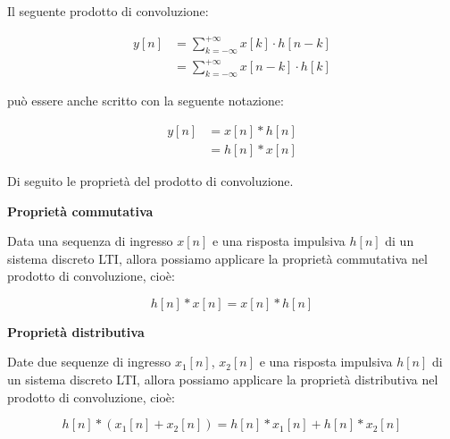 Il seguente prodotto di convoluzione: 

{
    \Large 
    \begin{equation}
        \begin{split}
        y \left[ n\right]
        &= 
        \sum_{k = - \infty}^{+ \infty}
        x \left[ k\right]
        \cdot 
        h \left[ n - k \right]
        \\
        &= 
        \sum_{k = - \infty}^{+ \infty}
        x \left[ n - k\right]
        \cdot 
        h \left[ k \right]
        \end{split}
    \end{equation}
}

può essere anche scritto con la seguente notazione: 

{
    \Large 
    \begin{equation}
        \begin{split}
        y \left[ n\right]
        &= 
        x \left[ n\right]
        *
        h \left[ n\right]
        \\
        &= 
        h \left[ n\right]
        *
        x \left[ n\right]
        \end{split}
    \end{equation}
}

Di seguito le proprietà del prodotto di convoluzione. \newline 

\textbf{Proprietà commutativa} \newline 

Data una sequenza di ingresso $x \left[ n\right]$ e una risposta impulsiva $h \left[ n\right]$ di un sistema discreto LTI, 
allora possiamo applicare la proprietà commutativa nel prodotto di convoluzione, cioè: 

{
    \Large 
    \begin{equation}
        h \left[ n\right]
        *
        x \left[ n\right]
        =
        x \left[ n\right]
        *
        h \left[ n\right] 
    \end{equation}
}

\textbf{Proprietà distributiva} \newline 

Date due sequenze di ingresso $x_1 \left[ n\right]$, $x_2 \left[ n\right]$ e una risposta impulsiva $h \left[ n\right]$ di un sistema discreto LTI, 
allora possiamo applicare la proprietà distributiva nel prodotto di convoluzione, cioè: 

{
    \Large 
    \begin{equation}
        h \left[ n\right]
        *
        \left( 
            x_1 \left[ n\right] 
            +
            x_2 \left[ n\right]
        \right)
        = 
        h \left[ n\right]
        *
        x_1 \left[ n\right]
        +
        h \left[ n\right]
        *
        x_2 \left[ n\right]
    \end{equation}
} 

